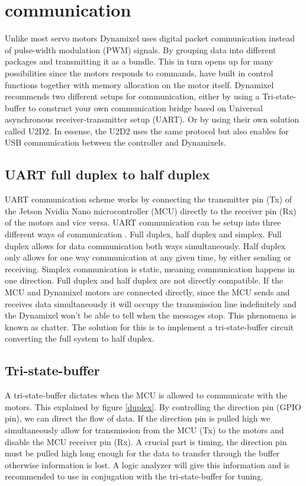 \section*{communication}
Unlike most servo motors Dynamixel uses digital packet communication instead of pulse-width modulation (PWM) signals.
By grouping data into different packages and transmitting it as a bundle.
This in turn opens up for many possibilities since the motors responds to commands,
have built in control functions together with memory allocation on the motor itself.
Dynamixel recommends two different setups for communication,
either by using a Tri-state-buffer to construct your own communication bridge  based on Universal asynchronous receiver-transmitter setup (UART). Or by using their own solution called U2D2.
In essense, the U2D2 uses the same protocol but also enables for USB communication between the controller and Dynamixels\cite{robotis}.

\subsection{UART full duplex to half duplex}
UART communication scheme works by connecting the transmitter pin (Tx) of the Jetson Nvidia Nano microcontroller (MCU)
directly to the receiver pin (Rx) of the motors and vice versa.
UART communication can be setup into three different ways of communication \cite{duplex}.
Full duplex, half duplex and simplex.
Full duplex allows for data communication both ways simultaneously.
Half duplex only allows for one way communication at any given time, by either sending or receiving.
Simplex communication is static, meaning communication happens in one direction.
\newline
Full duplex and half duplex are not directly compatible. 
If the MCU and Dynamixel motors are connected directly,
since the MCU sends and receives data simultaneously it will occupy the transmission line indefinitely and the Dynamixel won't be able to tell when the messages stop. 
This phenomena is known as chatter. 
The solution for this is to implement a tri-state-buffer circuit converting the full system to half duplex.

\subsection{Tri-state-buffer}

A tri-state-buffer dictates when the MCU is allowed to communicate with the motors. This explained  by figure \ref{duplex}.
By controlling the direction pin (GPIO pin),
we can direct the flow of data. 
If the direction pin is pulled high we simultaneously allow for transmission from the MCU (Tx) to the motors and disable the MCU receiver pin (Rx).
A crucial part is timing, the direction pin must be pulled high long enough for the data to transfer through the buffer otherwise information is lost.
A logic analyzer will give this information and is recommended to use in conjugation with the tri-state-buffer for tuning.

